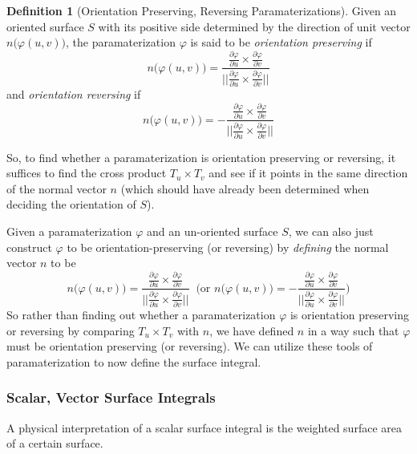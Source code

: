 \documentclass{article}
\theoremstyle{remark}
\theoremstyle{definition}
\newtheorem{definition}{Definition}[section]
\begin{document}
\begin{definition}[Orientation Preserving, Reversing Paramaterizations]
Given an oriented surface $S$ with its positive side determined by the direction of unit vector $n\big( \varphi(u,v)\big)$, the paramaterization $\varphi$ is said to be \textit{orientation preserving} if 
\[n \big( \varphi(u, v)\big) = \frac{\frac{\partial \varphi}{\partial u} \times \frac{\partial \varphi}{\partial v}}{\big|\big|\frac{\partial \varphi}{\partial u} \times \frac{\partial \varphi}{\partial v}\big|\big|}\]
and \textit{orientation reversing} if
\[n \big( \varphi(u, v)\big) = - \frac{\frac{\partial \varphi}{\partial u} \times \frac{\partial \varphi}{\partial v}}{\big|\big|\frac{\partial \varphi}{\partial u} \times \frac{\partial \varphi}{\partial v}\big|\big|}\]
\end{definition}

So, to find whether a paramaterization is orientation preserving or reversing, it suffices to find the cross product $T_u \times T_v$ and see if it points in the same direction of the normal vector $n$ (which should have already been determined when deciding the orientation of $S$). 

Given a paramaterization $\varphi$ and an un-oriented surface $S$, we can also just construct $\varphi$ to be orientation-preserving (or reversing) by \textit{defining} the normal vector $n$ to be 
\[n\big( \varphi(u, v)\big) = \frac{\frac{\partial \varphi}{\partial u} \times \frac{\partial \varphi}{\partial v}}{\big|\big|\frac{\partial \varphi}{\partial u} \times \frac{\partial \varphi}{\partial v}\big|\big|} \;\; \bigg( \text{or } n\big( \varphi(u, v)\big) = - \frac{\frac{\partial \varphi}{\partial u} \times \frac{\partial \varphi}{\partial v}}{\big|\big|\frac{\partial \varphi}{\partial u} \times \frac{\partial \varphi}{\partial v}\big|\big|} \bigg)\]
So rather than finding out whether a paramaterization $\varphi$ is orientation preserving or reversing by comparing $T_u \times T_v$ with $n$, we have defined $n$ in a way such that $\varphi$ must be orientation preserving (or reversing). We can utilize these tools of paramaterization to now define the surface integral. 

\subsubsection{Scalar, Vector Surface Integrals}

A physical interpretation of a scalar surface integral is the weighted surface area of a certain surface. 
\end{document}

